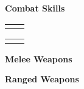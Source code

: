 \textbf{\large Combat Skills}\\
\begin{multicols}{2}
	\begin{tabular}{rl}
		\rangedcombatskills
	\end{tabular}
	\par
	\columnbreak
	\begin{tabular}{rl}
		\meleecombatskills
	\end{tabular}
\end{multicols}

\textbf{\large Melee Weapons}
\begin{multicols}{3}
\end{multicols}

\textbf{\large Ranged Weapons}
\begin{multicols}{3}
\end{multicols}
